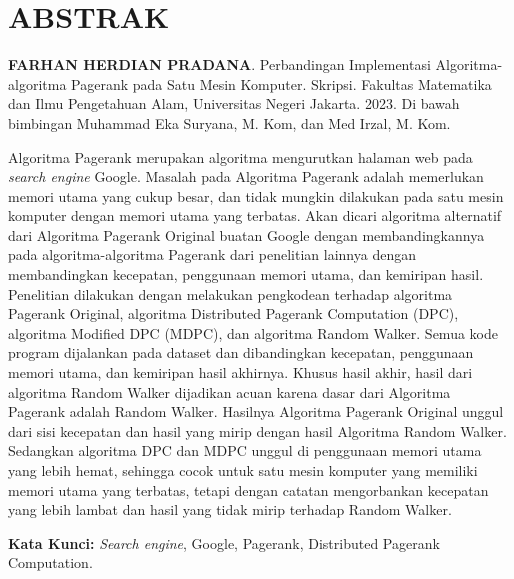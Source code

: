 \chapter*{ABSTRAK}

\textbf{FARHAN HERDIAN PRADANA}. Perbandingan Implementasi Algoritma-algoritma Pagerank pada Satu Mesin Komputer. Skripsi. Fakultas Matematika dan Ilmu Pengetahuan Alam, Universitas Negeri Jakarta. 2023. Di bawah bimbingan Muhammad Eka Suryana, M. Kom, dan Med Irzal, M. Kom.

Algoritma Pagerank merupakan algoritma mengurutkan halaman web pada \textit{search engine} Google. Masalah pada Algoritma Pagerank adalah memerlukan memori utama yang cukup besar, dan tidak mungkin dilakukan pada satu mesin komputer dengan memori utama yang terbatas. Akan dicari algoritma alternatif dari Algoritma Pagerank Original buatan Google dengan membandingkannya pada algoritma-algoritma Pagerank dari penelitian lainnya dengan membandingkan kecepatan, penggunaan memori utama, dan kemiripan hasil. Penelitian dilakukan dengan melakukan pengkodean terhadap algoritma Pagerank Original, algoritma Distributed Pagerank Computation (DPC), algoritma Modified DPC (MDPC), dan algoritma Random Walker. Semua kode program dijalankan pada dataset dan dibandingkan kecepatan, penggunaan memori utama, dan kemiripan hasil akhirnya. Khusus hasil akhir, hasil dari algoritma Random Walker dijadikan acuan karena dasar dari Algoritma Pagerank adalah Random Walker. Hasilnya Algoritma Pagerank Original unggul dari sisi kecepatan dan hasil yang mirip dengan hasil Algoritma Random Walker. Sedangkan algoritma DPC dan MDPC unggul di penggunaan memori utama yang lebih hemat, sehingga cocok untuk satu mesin komputer yang memiliki memori utama yang terbatas, tetapi dengan catatan mengorbankan kecepatan yang lebih lambat dan hasil yang tidak mirip terhadap Random Walker.

\noindent
\textbf{Kata Kunci:} \textit{Search engine}, Google, Pagerank, Distributed Pagerank Computation.